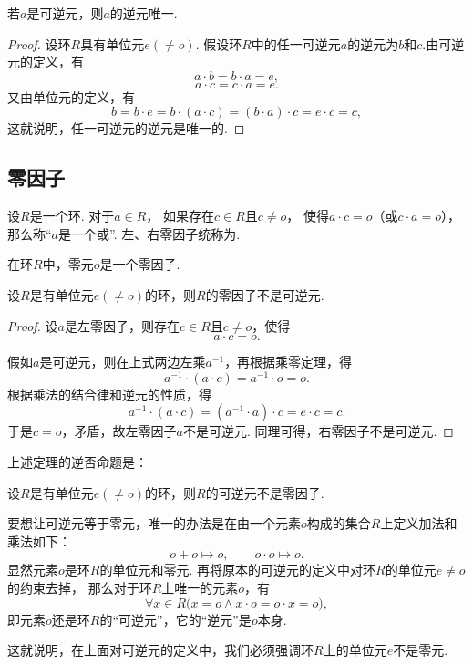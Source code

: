 \begin{property}
若\(a\)是可逆元，则\(a\)的逆元唯一.
\begin{proof}
设环\(R\)具有单位元\(e(\neq o)\).
假设环\(R\)中的任一可逆元\(a\)的逆元为\(b\)和\(c\).由可逆元的定义，有\[
    a \cdot b = b \cdot a = e,
\]\[
    a \cdot c = c \cdot a = e.
\]
又由单位元的定义，有\[
    b = b \cdot e
    = b \cdot (a \cdot c)
    = (b \cdot a) \cdot c
    = e \cdot c
    = c,
\]
这就说明，任一可逆元的逆元是唯一的.
\end{proof}
\end{property}

\subsection{零因子}
\begin{definition}
设\(R\)是一个环.
对于\(a \in R\)，
如果存在\(c \in R\)且\(c \neq o\)，
使得\(a \cdot c = o\)（或\(c \cdot a = o\)），
那么称“\(a\)是一个或”.
左、右零因子统称为.
\end{definition}

\begin{property}
在环\(R\)中，零元\(o\)是一个零因子.
\end{property}

\begin{theorem}
设\(R\)是有单位元\(e(\neq o)\)的环，则\(R\)的零因子不是可逆元.
\begin{proof}
设\(a\)是左零因子，则存在\(c \in R\)且\(c \neq o\)，使得\[
    a \cdot c = o.
\]

假如\(a\)是可逆元，则在上式两边左乘\(a^{-1}\)，再根据乘零定理，得\[
    a^{-1} \cdot (a \cdot c) = a^{-1} \cdot o = o.
\]
根据乘法的结合律和逆元的性质，得\[
    a^{-1} \cdot (a \cdot c) = (a^{-1} \cdot a) \cdot c = e \cdot c = c.
\]
于是\(c = o\)，矛盾，故左零因子\(a\)不是可逆元.
同理可得，右零因子不是可逆元.
\end{proof}
\end{theorem}

上述定理的逆否命题是：
\begin{corollary}
设\(R\)是有单位元\(e(\neq o)\)的环，则\(R\)的可逆元不是零因子.
\end{corollary}

\begin{example}
要想让可逆元等于零元，唯一的办法是在由一个元素\(o\)构成的集合\(R\)上定义加法和乘法如下：\[
    o + o \mapsto o,
    \qquad
    o \cdot o \mapsto o.
\]
显然元素\(o\)是环\(R\)的单位元和零元.
再将原本的可逆元的定义中对环\(R\)的单位元\(e \neq o\)的约束去掉，
那么对于环\(R\)上唯一的元素\(o\)，有\[
    \forall x \in R \bigl( x = o \land x \cdot o = o \cdot x = o \bigr),
\]
即元素\(o\)还是环\(R\)的“可逆元”，它的“逆元”是\(o\)本身.

这就说明，在上面对可逆元的定义中，我们必须强调环\(R\)上的单位元\(e\)不是零元.
\end{example}
